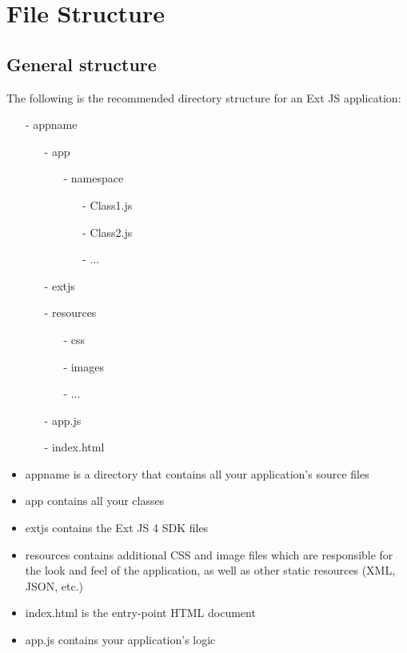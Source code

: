 \section{File Structure}
\subsection{General structure} 
\par The following is the recommended directory structure for an Ext JS application:
\begin{itemize}
\item[-] appname
\item[] \begin{itemize}
\item[-] app
       \begin{itemize}
	\item[-] namespace
	\item[]
		\begin{itemize}
	   		\item[-] Class1.js
		   	\item[-] Class2.js
		   	\item[-] ...
		\end{itemize}
	\end{itemize}
\item[-] extjs
\item[-] resources
	\begin{itemize}
	    \item[-]    css
	    \item[-] images
	     \item[-] ...
	\end{itemize}

\item[-] app.js
\item[-] index.html
\end{itemize}
\end{itemize}
\begin{itemize}
\item appname is a directory that contains all your application's source files
\item app contains all your classes
\item extjs contains the Ext JS 4 SDK files
\item resources contains additional CSS and image files which are responsible for the look and feel of the application, as well as other static resources (XML, JSON, etc.)
\item index.html is the entry-point HTML document
\item app.js contains your application's logic
\end{itemize}

